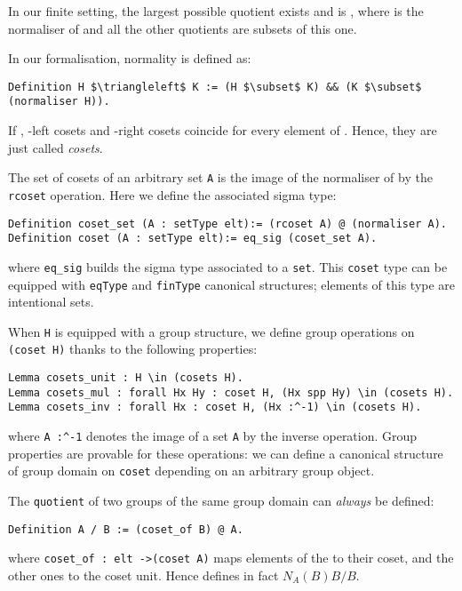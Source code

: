 In our finite setting, the largest possible quotient exists and is
, where  is the normaliser of  and
all the other quotients are subsets of this one.


In our formalisation, normality is defined as:
\begin{lstlisting} 
Definition H $\triangleleft$ K := (H $\subset$ K) && (K $\subset$ (normaliser H)).
\end{lstlisting}
If , -left cosets and
-right cosets coincide for every element of . Hence, they
are just called \emph{cosets}. 

The set of cosets of an arbitrary set
\lstinline[basicstyle=\footnotesize]+A+ is the image of the normaliser
of  by the \lstinline[basicstyle=\footnotesize]+rcoset+
operation. Here we define the associated sigma type:
\begin{lstlisting} 
Definition coset_set (A : setType elt):= (rcoset A) @ (normaliser A).  
Definition coset (A : setType elt):= eq_sig (coset_set A).
\end{lstlisting}
\noindent where \lstinline[basicstyle=\footnotesize]+eq_sig+ builds
the sigma type associated to a
\lstinline[basicstyle=\footnotesize]+set+. This
\lstinline[basicstyle=\footnotesize]+coset+ type can be equipped
with \lstinline[basicstyle=\footnotesize]+eqType+ and
\lstinline[basicstyle=\footnotesize]+finType+ canonical structures;
elements of this type are intentional sets.

When \lstinline[basicstyle=\footnotesize]+H+ is equipped with a group
structure, we define group operations on
\lstinline[basicstyle=\footnotesize]+(coset H)+ thanks to the
following properties:
\begin{lstlisting} 
Lemma cosets_unit : H \in (cosets H).  
Lemma cosets_mul : forall Hx Hy : coset H, (Hx spp Hy) \in (cosets H).
Lemma cosets_inv : forall Hx : coset H, (Hx :^-1) \in (cosets H).
\end{lstlisting}
\noindent where \lstinline[basicstyle=\footnotesize]+A :^-1+ denotes
the image of a set \lstinline[basicstyle=\footnotesize]+A+ by the
inverse operation. Group properties are provable for these operations:
we can define a canonical structure of group domain on
\lstinline[basicstyle=\footnotesize]+coset+ depending on an
arbitrary group object.

\noindent The \lstinline[basicstyle=\footnotesize]+quotient+ of two
groups of the same group domain can \emph{always} be defined:

\begin{lstlisting} 
Definition A / B := (coset_of B) @ A.
\end{lstlisting}
\noindent where \lstinline[basicstyle=\footnotesize]+coset_of : elt ->(coset A)+
maps elements of the  to their coset, and the other
ones to the coset unit.
Hence  defines in fact $N_A(B)B/B$.

